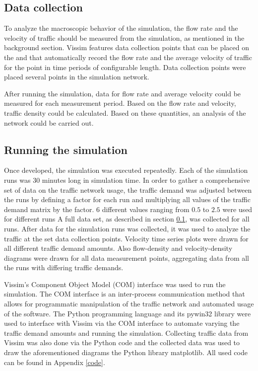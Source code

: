 \documentclass[english, 12pt, a4paper, elec, utf8, pdfa, online]{aaltothesis}
\begin{document}
\subsection{Data collection} \label{data}

To analyze the macroscopic behavior of the simulation, the flow rate and the velocity of traffic should be measured from the simulation, as mentioned in the background section. Vissim features data collection points that can be placed on the and that automatically record the flow rate and the average velocity of traffic for the point in time periods of configurable length. Data collection points were placed several points in the simulation network. 

After running the simulation, data for flow rate and average velocity could be measured for each measurement period. Based on the flow rate and velocity, traffic density could be calculated. Based on these quantities, an analysis of the network could be carried out.

\subsection{Running the simulation}

Once developed, the simulation was executed repeatedly. Each of the simulation runs was 30 minutes long in simulation time. In order to gather a comprehensive set of data on the traffic network usage, the traffic demand was adjusted between the runs by defining a factor for each run and multiplying all values of the traffic demand matrix by the factor. 6 different values ranging from $0.5$ to $2.5$ were used for different runs A full data set, as described in section \ref{data}, was collected for all runs. After data for the simulation runs was collected, it was used to analyze the traffic at the set data collection points. Velocity time series plots were drawn for all different traffic demand amounts. Also flow-density and velocity-density diagrams were drawn for all data measurement points, aggregating data from all the runs with differing traffic demands.

Vissim's Component Object Model (COM) interface was used to run the simulation. The COM interface is an inter-process communication method that allows for programmatic manipulation of the traffic network and automated usage of the software. The Python programming language and its pywin32 library were used to interface with Vissim via the COM interface to automate varying the traffic demand amounts and running the simulation. Collecting traffic data from Vissim was also done via the Python code and the collected data was used to draw the aforementioned diagrams the Python library matplotlib. All used code can be found in Appendix \ref{code}.
\end{document}
